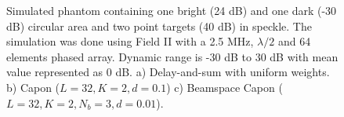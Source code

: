 \documentclass[12pt,journal,onecolumn]{IEEEtran}
\begin{document}
\begin{figure}[!t]
\centerline{
\hfil
{}
\hfil
{}}
\caption{Simulated phantom containing one bright (24 dB) and one dark (-30 dB) circular area and two point targets (40 dB) in speckle. The simulation was done using Field II with a 2.5 MHz, $\lambda/2$ and 64 elements phased array. Dynamic range is -30 dB to 30 dB with mean value represented as 0 dB. a) Delay-and-sum with uniform weights. b) Capon ($L=32, K=2, d=0.1$) c) Beamspace Capon ($L=32, K=2, N_b=3, d=0.01$).}
\label{fig:phantom}
\end{figure}
\end{document}
